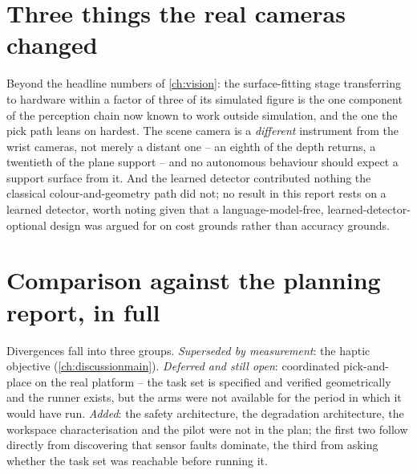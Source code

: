 \section{Three things the real cameras changed}

Beyond the headline numbers of \cref{ch:vision}: the surface-fitting stage
transferring to hardware within a factor of three of its simulated figure is
the one component of the perception chain now known to work outside
simulation, and the one the pick path leans on hardest. The scene camera is
a \emph{different} instrument from the wrist cameras, not merely a distant
one -- an eighth of the depth returns, a twentieth of the plane support --
and no autonomous behaviour should expect a support surface from it. And the
learned detector contributed nothing the classical colour-and-geometry path
did not; no result in this report rests on a learned detector, worth noting
given that a language-model-free, learned-detector-optional design was
argued for on cost grounds rather than accuracy grounds.

\section{Comparison against the planning report, in full}

Divergences fall into three groups. \emph{Superseded by measurement}: the
haptic objective (\cref{ch:discussionmain}). \emph{Deferred and still open}:
coordinated pick-and-place on the real platform -- the task set is specified
and verified geometrically and the runner exists, but the arms were not
available for the period in which it would have run. \emph{Added}: the
safety architecture, the degradation architecture, the workspace
characterisation and the pilot were not in the plan; the first two follow
directly from discovering that sensor faults dominate, the third from asking
whether the task set was reachable before running it.
